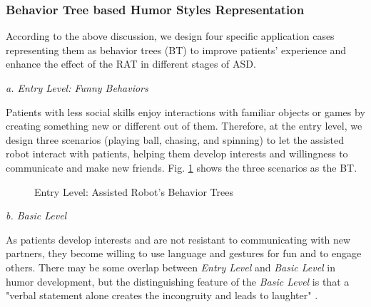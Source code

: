 \documentclass[letterpaper]{article} %
\begin{document}
\subsubsection{Behavior Tree based Humor Styles Representation}

According to the above discussion, we design four specific application cases representing them as behavior trees (BT) \cite{colledanchise2018behavior} to improve patients' experience and enhance the effect of the RAT in different stages of ASD.

\textit{a. Entry Level: Funny Behaviors}

Patients with less social skills enjoy interactions with familiar objects or games by creating something new or different out of them. Therefore, at the entry level, we design three scenarios (playing ball, chasing, and spinning) to let the assisted robot interact with patients, helping them develop interests and willingness to communicate and make new friends. Fig. \ref{fig:bt_el} shows the three scenarios as the BT.

\begin{figure}
\centering
{}
 \caption{Entry Level: Assisted Robot's Behavior Trees}
 \label{fig:bt_el}
 \end{figure}



\textit{b. Basic Level}

As patients develop interests and are not resistant to communicating with new partners, they become willing to use language and gestures for fun and to engage others. There may be some overlap between \textit{Entry Level} and \textit{Basic Level} in humor development, but the distinguishing feature of the \textit{Basic Level} is that a "verbal statement alone creates the incongruity and leads to laughter" \cite{mcghee1979humor}.
\end{document}
